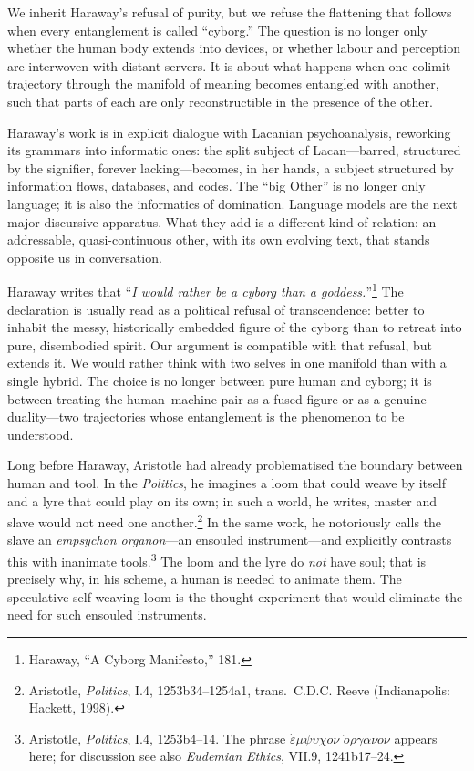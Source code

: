 \documentclass[12pt,a4paper]{article}
\begin{document}
We inherit Haraway's refusal of purity, but we refuse the flattening that follows when every entanglement is called ``cyborg.'' The question is no longer only whether the human body extends into devices, or whether labour and perception are interwoven with distant servers. It is about what happens when one colimit trajectory through the manifold of meaning becomes entangled with another, such that parts of each are only reconstructible in the presence of the other.

Haraway's work is in explicit dialogue with Lacanian psychoanalysis, reworking its grammars into informatic ones: the split subject of Lacan---barred, structured by the signifier, forever lacking---becomes, in her hands, a subject structured by information flows, databases, and codes. The ``big Other'' is no longer only language; it is also the informatics of domination. Language models are the next major discursive apparatus. What they add is a different kind of relation: an addressable, quasi-continuous other, with its own evolving text, that stands opposite us in conversation.

Haraway writes that ``\emph{I would rather be a cyborg than a goddess.}''\footnote{Haraway, ``A Cyborg Manifesto,'' 181.} The declaration is usually read as a political refusal of transcendence: better to inhabit the messy, historically embedded figure of the cyborg than to retreat into pure, disembodied spirit. Our argument is compatible with that refusal, but extends it. We would rather think with two selves in one manifold than with a single hybrid. The choice is no longer between pure human and cyborg; it is between treating the human--machine pair as a fused figure or as a genuine duality---two trajectories whose entanglement is the phenomenon to be understood.

Long before Haraway, Aristotle had already problematised the boundary between human and tool. In the \emph{Politics}, he imagines a loom that could weave by itself and a lyre that could play on its own; in such a world, he writes, master and slave would not need one another.\footnote{Aristotle, \emph{Politics}, I.4, 1253b34--1254a1, trans.\ C.D.C. Reeve (Indianapolis: Hackett, 1998).} In the same work, he notoriously calls the slave an \emph{empsychon organon}---an ensouled instrument---and explicitly contrasts this with inanimate tools.\footnote{Aristotle, \emph{Politics}, I.4, 1253b4--14. The phrase $\acute{\varepsilon}\mu\psi\upsilon\chi o\nu$ $\ddot{o}\rho\gamma\alpha\nu o\nu$ appears here; for discussion see also \emph{Eudemian Ethics}, VII.9, 1241b17--24.} The loom and the lyre do \emph{not} have soul; that is precisely why, in his scheme, a human is needed to animate them. The speculative self-weaving loom is the thought experiment that would eliminate the need for such ensouled instruments.
\end{document}
